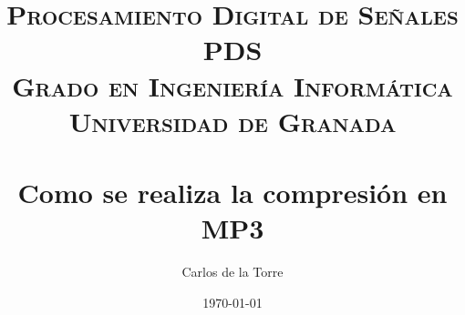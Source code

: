 


\titlehead{}%
\title{	
\normalfont \normalsize 
\textsc{{Procesamiento Digital de Señales PDS} \\ Grado en Ingeniería Informática \\ Universidad de Granada} \\ [25pt] %
\horrule{0.5pt} \\[0.4cm] %
\huge Como se realiza la compresión en MP3 %
\horrule{2pt} \\[0.5cm] %
}
\author{Carlos de la Torre}
\date{\normalsize\today} %




\maketitle %
\begin{figure}[H]
	\centering
	\label{fig:LogoOdoo}
\end{figure}

\thispagestyle{empty}

\newpage %
\thispagestyle{empty} 

\hypertarget{Elindice}{} %
\tableofcontents %


\thispagestyle{empty} %
\newpage
\setcounter{page}{1} %

